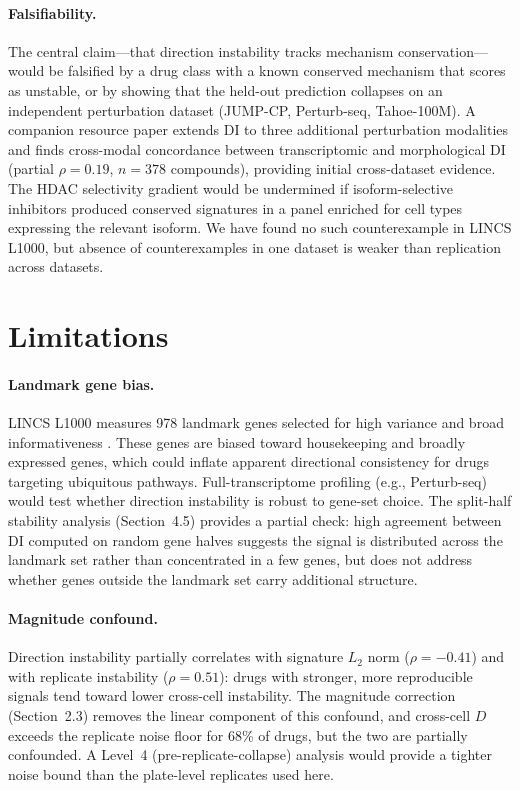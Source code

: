 \documentclass[11pt]{article}
\begin{document}
\paragraph{Falsifiability.}
The central claim---that direction instability tracks mechanism
conservation---would be falsified by a drug class with a known
conserved mechanism that scores as unstable, or by showing that the
held-out prediction collapses on an independent perturbation dataset
(JUMP-CP, Perturb-seq, Tahoe-100M).  A companion resource paper
extends DI to three additional perturbation modalities and finds
cross-modal concordance between transcriptomic and morphological DI
(partial $\rho = 0.19$, $n = 378$ compounds), providing initial
cross-dataset evidence.  The HDAC selectivity gradient would be
undermined if isoform-selective inhibitors produced conserved
signatures in a panel enriched for cell types expressing the relevant
isoform.  We have found no such counterexample in LINCS L1000, but
absence of counterexamples in one dataset is weaker than replication
across datasets.

\section{Limitations}

\paragraph{Landmark gene bias.}
LINCS L1000 measures 978 landmark genes selected for high variance and
broad informativeness \citep{subramanian2017next}.  These genes are
biased toward housekeeping and broadly expressed genes, which could
inflate apparent directional consistency for drugs targeting ubiquitous
pathways.  Full-transcriptome profiling (e.g., Perturb-seq) would test
whether direction instability is robust to gene-set choice.  The
split-half stability analysis (Section~4.5) provides a partial check:
high agreement between DI computed on random gene halves suggests the
signal is distributed across the landmark set rather than concentrated
in a few genes, but does not address whether genes outside the landmark
set carry additional structure.

\paragraph{Magnitude confound.}
Direction instability partially correlates with signature $L_2$ norm
($\rho = -0.41$) and with replicate instability ($\rho = 0.51$): drugs
with stronger, more reproducible signals tend toward lower cross-cell
instability.  The magnitude correction (Section~2.3) removes the linear
component of this confound, and cross-cell $D$ exceeds the replicate
noise floor for 68\% of drugs, but the two are partially confounded.
A Level~4 (pre-replicate-collapse) analysis would provide a tighter
noise bound than the plate-level replicates used here.
\end{document}
